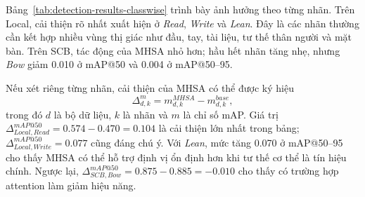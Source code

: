 Bảng~\ref{tab:detection-results-classwise} trình bày ảnh hưởng theo từng nhãn. Trên Local, cải thiện rõ nhất xuất hiện ở \textit{Read}, \textit{Write} và \textit{Lean}. Đây là các nhãn thường cần kết hợp nhiều vùng thị giác như đầu, tay, tài liệu, tư thế thân người và mặt bàn. Trên SCB, tác động của MHSA nhỏ hơn; hầu hết nhãn tăng nhẹ, nhưng \textit{Bow} giảm 0.010 ở mAP@50 và 0.004 ở mAP@50--95.

\begin{table}[htbp]
\centering
\caption{mAP theo từng nhãn sau khi bổ sung MHSA vào YOLO26n.}
\label{tab:detection-results-classwise}
\end{table}

Nếu xét riêng từng nhãn, cải thiện của MHSA có thể được ký hiệu
\begin{equation}
\label{eq:metric-difference}
    \Delta_{d,k}^{m}=m_{d,k}^{MHSA}-m_{d,k}^{base},
\end{equation}
trong đó \(d\) là bộ dữ liệu, \(k\) là nhãn và \(m\) là chỉ số mAP. Giá trị \(\Delta_{Local,Read}^{mAP@50}=0.574-0.470=0.104\) là cải thiện lớn nhất trong bảng; \(\Delta_{Local,Write}^{mAP@50}=0.077\) cũng đáng chú ý. Với \textit{Lean}, mức tăng 0.070 ở mAP@50--95 cho thấy MHSA có thể hỗ trợ định vị ổn định hơn khi tư thế cơ thể là tín hiệu chính. Ngược lại, \(\Delta_{SCB,Bow}^{mAP@50}=0.875-0.885=-0.010\) cho thấy có trường hợp attention làm giảm hiệu năng.

